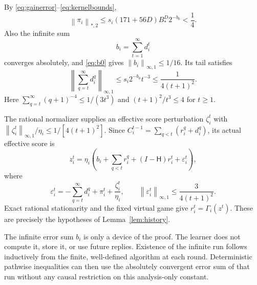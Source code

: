 \documentclass[11pt]{article}
\newcommand{\norm}[1]{\left\lVert#1\right\rVert}
\newcommand{\rn}[1]{\norm{#1}_{\infty,1}}
\newcommand{\Pred}{\mathsf H}
\begin{document}
By \eqref{eq:gainerror}--\eqref{eq:kernelbounds},
\[
 \norm{\pi_i}_{*,2}
 \leq s_i(171+56D)B_*^D2^{-b_0}<\frac14.
\]
Also the infinite sum
\[
 b_i=\sum_{t=1}^\infty d_i^t
\]
converges absolutely, and \eqref{eq:b0} gives $\rn{b_i}\leq1/16$.
Its tail satisfies
\[
 \rn{\sum_{q=t}^\infty d_i^q}
 \leq s_i2^{-b_0}t^{-3}
 \leq\frac1{4(t+1)^2}.
\]
Here $\sum_{q=t}^\infty(q+1)^{-4}\leq1/(3t^3)$ and
$(t+1)^2/t^3\leq4$ for $t\geq1$.

The rational normalizer supplies an effective score perturbation
$\zeta_i^t$ with
$\rn{\zeta_i^t}/\eta_i\leq1/[4(t+1)^2]$.  Since
$C_i^{t-1}=\sum_{q<t}(r_i^q+d_i^q)$, its actual effective score is
\[
 z_i^t=\eta_i\left(b_i+\sum_{q<t}r_i^q
 +(I-\Pred)r_i^t+\varepsilon_i^t\right),
\]
where
\[
 \varepsilon_i^t=
 -\sum_{q=t}^\infty d_i^q+\pi_i^t+\frac{\zeta_i^t}{\eta_i},
 \qquad\rn{\varepsilon_i^t}\leq\frac3{4(t+1)^2}.
\]
Exact rational stationarity and the fixed virtual game give
$r_i^t=\Gamma_i(z^t)$.  These are precisely the hypotheses of
Lemma~\ref{lem:history}.

The infinite error sum $b_i$ is only a device of the proof.  The
learner does not compute it, store it, or use future replies.
Existence of the infinite run follows inductively from the finite,
well-defined algorithm at each round.  Deterministic pathwise
inequalities can then use the absolutely convergent error sum of
that run without any causal restriction on this analysis-only
constant.
\end{document}
